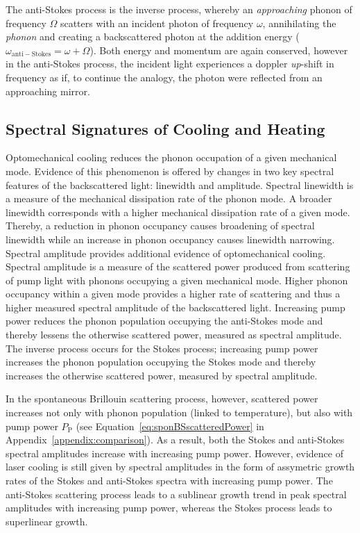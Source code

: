 The anti-Stokes process is the inverse process, whereby an \textit{approaching} phonon of frequency \(\Omega\) scatters with an incident photon of frequency \(\omega\), annihilating the \textit{phonon} and creating a backscattered photon at the addition energy (\(\omega_{\mathrm{anti-Stokes}} = \omega + \Omega\)). Both energy and momentum are again conserved, however in the anti-Stokes process, the incident light experiences a doppler \textit{up}-shift in frequency as if, to continue the analogy, the photon were reflected from an approaching mirror.

\subsection{Spectral Signatures of Cooling and Heating}
\label{Cooling:subsec:SpectralSignaturesofCoolingandHeating}
Optomechanical cooling reduces the phonon occupation of a given mechanical mode. Evidence of this phenomenon is offered by changes in two key spectral features of the backscattered light: linewidth and amplitude. Spectral linewidth is a measure of the mechanical dissipation rate of the phonon mode. A broader linewidth corresponds with a higher mechanical dissipation rate of a given mode. Thereby, a reduction in phonon occupancy causes broadening of spectral linewidth while an increase in phonon occupancy causes linewidth narrowing. Spectral amplitude provides additional evidence of optomechanical cooling. Spectral amplitude is a measure of the scattered power produced from scattering of pump light with phonons occupying a given mechanical mode. Higher phonon occupancy within a given mode provides a higher rate of scattering and thus a higher measured spectral amplitude of the backscattered light. Increasing pump power reduces the phonon population occupying the anti-Stokes mode and thereby lessens the otherwise scattered power, measured as spectral amplitude. The inverse process occurs for the Stokes process; increasing pump power increases the phonon population occupying the Stokes mode and thereby increases the otherwise scattered power, measured by spectral amplitude.

In the spontaneous Brillouin scattering process, however, scattered power increases not only with phonon population (linked to temperature), but also with pump power \(P_{\mathrm{P}}\) (see Equation~\ref{eq:sponBSscatteredPower} in Appendix~\ref{appendix:comparison}). As a result, both the Stokes and anti-Stokes spectral amplitudes increase with increasing pump power. However, evidence of laser cooling is still given by spectral amplitudes in the form of assymetric growth rates of the Stokes and anti-Stokes spectra with increasing pump power. The anti-Stokes scattering process leads to a sublinear growth trend in peak spectral amplitudes with increasing pump power, whereas the Stokes process leads to superlinear growth.
